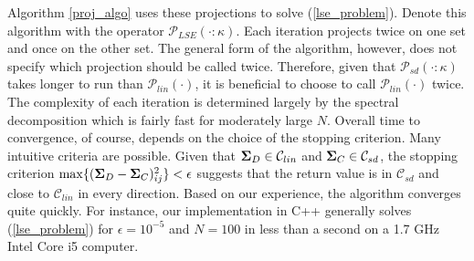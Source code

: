 \documentclass[11pt]{article}
\theoremstyle{definition}
\theoremstyle{definition}
\def\bSigma{{\bf \Sigma}}
\begin{document}
 Algorithm \ref{proj_algo} uses these projections to solve (\ref{lse_problem}). Denote this algorithm with the operator $\mathcal{P}_{LSE}(\cdot : \kappa)$. Each iteration projects twice on one set and once on the other set. The general form of the algorithm, however, does not specify which projection should be called twice. Therefore, given that $\mathcal{P}_{sd}(\cdot:\kappa)$ takes longer to run than $\mathcal{P}_{lin}(\cdot)$, it is beneficial to choose to call $\mathcal{P}_{lin}(\cdot)$ twice.  The complexity of each iteration is determined largely by the spectral decomposition which is fairly fast for moderately large $N$. Overall time to convergence, of course, depends on the choice of the stopping criterion. Many intuitive criteria are possible. Given that $\bSigma_D \in \mathcal{C}_{lin}$ and $\bSigma_C \in \mathcal{C}_{sd}$, the stopping criterion $\max \{(\bSigma_{D}-\bSigma_{C})_{ij}^2\} < \epsilon$ suggests that the return value is in $\mathcal{C}_{sd}$ and close to $\mathcal{C}_{lin}$ in every direction. Based on our experience, the algorithm converges quite quickly. For instance, our implementation in C++ generally solves (\ref{lse_problem}) for $\epsilon = 10^{-5}$ and $N = 100$  in less than a second on a 1.7 GHz Intel Core i5 computer.  
 
 
% 
% 

% 
  
\end{document}
